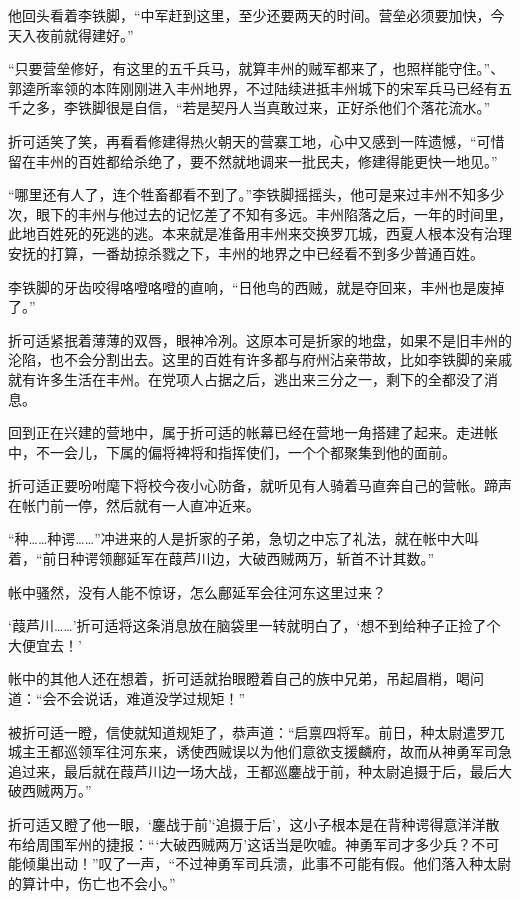 他回头看着李铁脚，“中军赶到这里，至少还要两天的时间。营垒必须要加快，今天入夜前就得建好。”

“只要营垒修好，有这里的五千兵马，就算丰州的贼军都来了，也照样能守住。”、郭逵所率领的本阵刚刚进入丰州地界，不过陆续进抵丰州城下的宋军兵马已经有五千之多，李铁脚很是自信，“若是契丹人当真敢过来，正好杀他们个落花流水。”

折可适笑了笑，再看看修建得热火朝天的营寨工地，心中又感到一阵遗憾，“可惜留在丰州的百姓都给杀绝了，要不然就地调来一批民夫，修建得能更快一地见。”

“哪里还有人了，连个牲畜都看不到了。”李铁脚摇摇头，他可是来过丰州不知多少次，眼下的丰州与他过去的记忆差了不知有多远。丰州陷落之后，一年的时间里，此地百姓死的死逃的逃。本来就是准备用丰州来交换罗兀城，西夏人根本没有治理安抚的打算，一番劫掠杀戮之下，丰州的地界之中已经看不到多少普通百姓。

李铁脚的牙齿咬得咯噔咯噔的直响，“日他鸟的西贼，就是夺回来，丰州也是废掉了。”

折可适紧抿着薄薄的双唇，眼神冷冽。这原本可是折家的地盘，如果不是旧丰州的沦陷，也不会分割出去。这里的百姓有许多都与府州沾亲带故，比如李铁脚的亲戚就有许多生活在丰州。在党项人占据之后，逃出来三分之一，剩下的全都没了消息。

回到正在兴建的营地中，属于折可适的帐幕已经在营地一角搭建了起来。走进帐中，不一会儿，下属的偏将裨将和指挥使们，一个个都聚集到他的面前。

折可适正要吩咐麾下将校今夜小心防备，就听见有人骑着马直奔自己的营帐。蹄声在帐门前一停，然后就有一人直冲近来。

“种……种谔……”冲进来的人是折家的子弟，急切之中忘了礼法，就在帐中大叫着，“前日种谔领鄜延军在葭芦川边，大破西贼两万，斩首不计其数。”

帐中骚然，没有人能不惊讶，怎么鄜延军会往河东这里过来？

‘葭芦川……’折可适将这条消息放在脑袋里一转就明白了，‘想不到给种子正捡了个大便宜去！’

帐中的其他人还在想着，折可适就抬眼瞪着自己的族中兄弟，吊起眉梢，喝问道：“会不会说话，难道没学过规矩！”

被折可适一瞪，信使就知道规矩了，恭声道：“启禀四将军。前日，种太尉遣罗兀城主王都巡领军往河东来，诱使西贼误以为他们意欲支援麟府，故而从神勇军司急追过来，最后就在葭芦川边一场大战，王都巡鏖战于前，种太尉追摄于后，最后大破西贼两万。”

折可适又瞪了他一眼，‘鏖战于前’‘追摄于后’，这小子根本是在背种谔得意洋洋散布给周围军州的捷报：“‘大破西贼两万’这话当是吹嘘。神勇军司才多少兵？不可能倾巢出动！”叹了一声，“不过神勇军司兵溃，此事不可能有假。他们落入种太尉的算计中，伤亡也不会小。”

